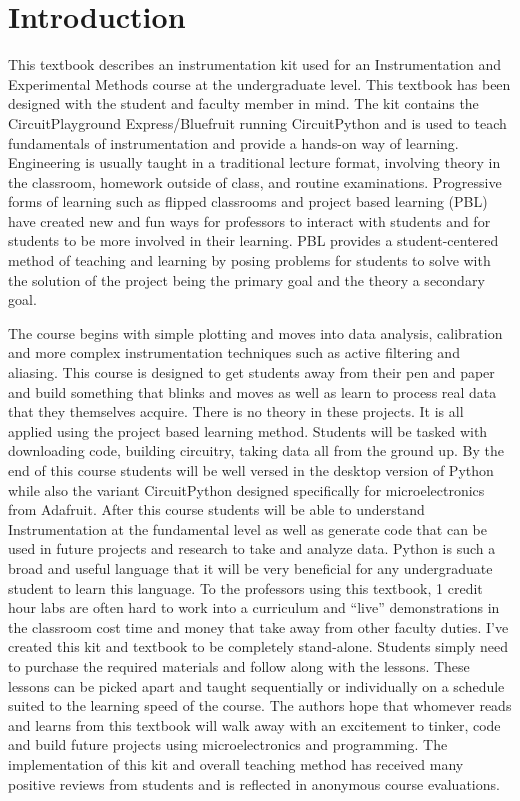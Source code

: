 \newpage

\section{Introduction}

This textbook describes an instrumentation kit used for an
Instrumentation and Experimental Methods course at the undergraduate
level. This textbook has been designed with the student and faculty member in
mind. The kit contains the CircuitPlayground
Express/Bluefruit running CircuitPython and is used to teach
fundamentals of instrumentation and provide a hands-on way of
learning. Engineering is usually taught in a
traditional lecture format, involving theory in the classroom,
homework outside of class, and routine examinations. Progressive forms
of learning such as flipped classrooms and project based learning
(PBL) have created new and fun ways for professors to interact with
students and for students to be more involved in their learning. PBL
provides a student-centered method of teaching and learning by posing
problems for students to solve with the solution of the project being
the primary goal and the theory a secondary goal.

The course begins with simple plotting and moves into data analysis,
calibration and more complex instrumentation techniques 
such as active filtering and aliasing. This course is designed to get
students away from their pen and paper and build something that blinks
and moves as well as learn to process real data that they themselves
acquire. There is no theory in these projects. It is all applied using
the project based learning method. Students will be tasked with
downloading code, building circuitry, taking data all from the ground
up. By the end of this course students will be well versed in the
desktop version of Python while also the variant CircuitPython
designed specifically for microelectronics from Adafruit. After this
course students will be able to understand Instrumentation at the
fundamental level as well as generate code that can be used in future
projects and research to take and analyze data. Python is such a broad
and useful language that it will be very beneficial for any
undergraduate student to learn this language. To the professors using
this textbook, 1 credit hour labs are often hard to work into a
curriculum and “live” demonstrations in the classroom cost time and
money that take away from other faculty duties. I’ve created this kit
and textbook to be completely stand-alone. Students simply need to
purchase the required materials and follow along with the
lessons. These lessons can be picked apart and taught sequentially or
individually on a schedule suited to the learning speed of the
course. The authors hope that whomever reads and learns from this
textbook will walk away with an excitement to tinker, code and build
future projects using microelectronics and programming. The
implementation of this kit and overall teaching method has received
many positive reviews from students and is reflected in anonymous course
evaluations.

